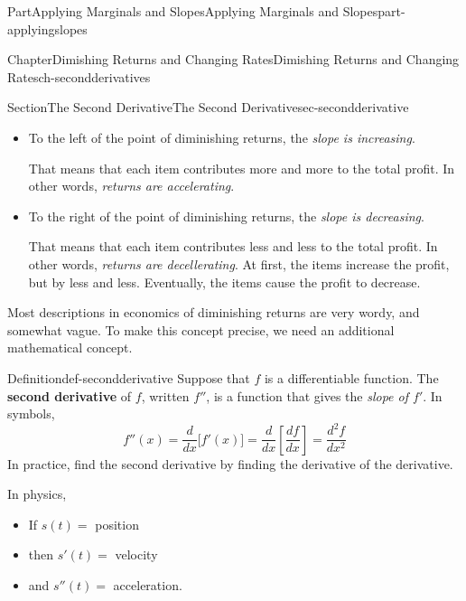\documentclass{tufte-book}
\newcommand{\terminology}[1]{\textbf{#1}}
\numberwithin{equation}{chapter}
\def\drawtikzspline(#1,#2,#3,#4,#5,#6){ \draw[curve,domain=(#1):(#4)] plot (\x , { ( (((#3) + (#6))*(#1) - ((#3) + (#6))*(#4) - 2*(#2) + 2*(#5))/((#1)^3 - 3*((#1)^2)*(#4) + 3*(#1)*((#4)^2) - (#4)^3) )*((\x)^3) + ( -(((#3) + 2*(#6))*((#1)^2) + ((#3) - (#6))*(#1)*(#4) - (2*(#3) + (#6))*((#4)^2) - 3*((#1) + (#4))*(#2) + 3*((#1) + (#4))*(#5))/((#1)^3 - 3*((#1)^2)*(#4) + 3*(#1)*((#4)^2) - (#4)^3) ) *((\x)^2) + ( ((#6)*((#1)^3) + (2*(#3) + (#6))*((#1)^2)*(#4) - ((#3) + 2*(#6))*(#1)*((#4)^2) - (#3)*((#4)^3) - 6*(#1)*(#4)*(#2) + 6*(#1)*(#4)*(#5))/((#1)^3 - 3*((#1)^2)*(#4) + 3*(#1)*((#4)^2) - (#4)^3) ) * (\x) + ( -((#6)*((#1)^3)*(#4) + ((#3) - (#6))*((#1)^2)*(#4)^2 - (#3)*(#1)*((#4)^3) - (3*(#1)*((#4)^2) - (#4)^3)*(#2) - ((#1)^3 - 3*((#1)^2)*(#4))*(#5))/((#1)^3 - 3*((#1)^2)*(#4) + 3*(#1)*((#4)^2) - (#4)^3))}) }
\newcommand{\ddx}[1]{ \dfrac{d}{dx} \Big[ #1 \Big]  }
\newcommand{\ddxfrac}[1]{ \dfrac{d}{dx} \left[ #1 \right]  }
\begin{document}
\begin{partptx}{Part}{Applying Marginals and Slopes}{}{Applying Marginals and Slopes}{}{}{part-applyingslopes}
\begin{chapterptx}{Chapter}{Dimishing Returns and Changing Rates}{}{Dimishing Returns and Changing Rates}{}{}{ch-secondderivatives}
\begin{sectionptx}{Section}{The Second Derivative}{}{The Second Derivative}{}{}{sec-secondderivative}
\begin{image}{0.3}{0.4}{0.3}{}
{
}%
\end{image}%
%
\begin{itemize}[label=\textbullet]
\item{}To the left of the point of diminishing returns, the \emph{slope is increasing}.%
\par
That means that each item contributes more and more to the total profit. In other words, \emph{returns are accelerating}.%
\item{}To the right of the point of diminishing returns, the \emph{slope is decreasing}.%
\par
That means that each item contributes less and less to the total profit. In other words, \emph{returns are decellerating}. At first, the items increase the profit, but by less and less. Eventually, the items cause the profit to decrease.%
\end{itemize}
%
\par
Most descriptions in economics of diminishing returns are very wordy, and somewhat vague. To make this concept precise, we need an additional mathematical concept.%
\begin{definition}{Definition}{}{def-secondderivative}%
Suppose that \(f\) is a differentiable function. The \terminology{second derivative} of \(f\), written \(f''\), is a function that gives the \emph{slope of \(f'\)}.  In symbols,%
\begin{equation*}
f''(x) = \ddx{ f'(x) } = \ddxfrac{\frac{df}{dx} } = \dfrac{d^2f}{dx^2}
\end{equation*}
In practice, find the second derivative by finding the derivative of the derivative.%
\end{definition}
In physics,%
\begin{itemize}[label=\textbullet]
\item{}If \(s(t) = \) position%
\item{}then \(s'(t) = \) velocity%
\item{}and \(s''(t) = \) acceleration.%
\end{itemize}

\end{sectionptx}
\end{chapterptx}
\end{partptx}
\end{document}
